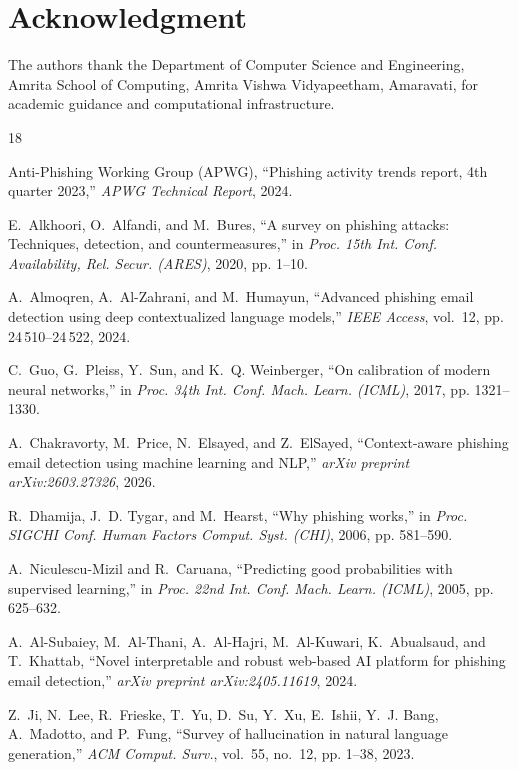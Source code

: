 \documentclass[conference]{IEEEtran}
\begin{document}
\section*{Acknowledgment}
The authors thank the Department of Computer Science and Engineering, Amrita School of Computing, Amrita Vishwa Vidyapeetham, Amaravati, for academic guidance and computational infrastructure.

\begin{thebibliography}{18}

Anti-Phishing Working Group (APWG), ``Phishing activity trends report, 4th quarter 2023,'' \emph{APWG Technical Report}, 2024.

E.~Alkhoori, O.~Alfandi, and M.~Bures, ``A survey on phishing attacks: Techniques, detection, and countermeasures,'' in \emph{Proc. 15th Int. Conf. Availability, Rel. Secur. (ARES)}, 2020, pp. 1--10.

A.~Almoqren, A.~Al-Zahrani, and M.~Humayun, ``Advanced phishing email detection using deep contextualized language models,'' \emph{IEEE Access}, vol.~12, pp. 24\,510--24\,522, 2024.

C.~Guo, G.~Pleiss, Y.~Sun, and K.~Q. Weinberger, ``On calibration of modern neural networks,'' in \emph{Proc. 34th Int. Conf. Mach. Learn. (ICML)}, 2017, pp. 1321--1330.

A.~Chakravorty, M.~Price, N.~Elsayed, and Z.~ElSayed, ``Context-aware phishing email detection using machine learning and NLP,'' \emph{arXiv preprint arXiv:2603.27326}, 2026.

R.~Dhamija, J.~D. Tygar, and M.~Hearst, ``Why phishing works,'' in \emph{Proc. SIGCHI Conf. Human Factors Comput. Syst. (CHI)}, 2006, pp. 581--590.

A.~Niculescu-Mizil and R.~Caruana, ``Predicting good probabilities with supervised learning,'' in \emph{Proc. 22nd Int. Conf. Mach. Learn. (ICML)}, 2005, pp. 625--632.

A.~Al-Subaiey, M.~Al-Thani, A.~Al-Hajri, M.~Al-Kuwari, K.~Abualsaud, and T.~Khattab, ``Novel interpretable and robust web-based AI platform for phishing email detection,'' \emph{arXiv preprint arXiv:2405.11619}, 2024.

Z.~Ji, N.~Lee, R.~Frieske, T.~Yu, D.~Su, Y.~Xu, E.~Ishii, Y.~J. Bang, A.~Madotto, and P.~Fung, ``Survey of hallucination in natural language generation,'' \emph{ACM Comput. Surv.}, vol.~55, no.~12, pp. 1--38, 2023.


\end{thebibliography}
\end{document}
